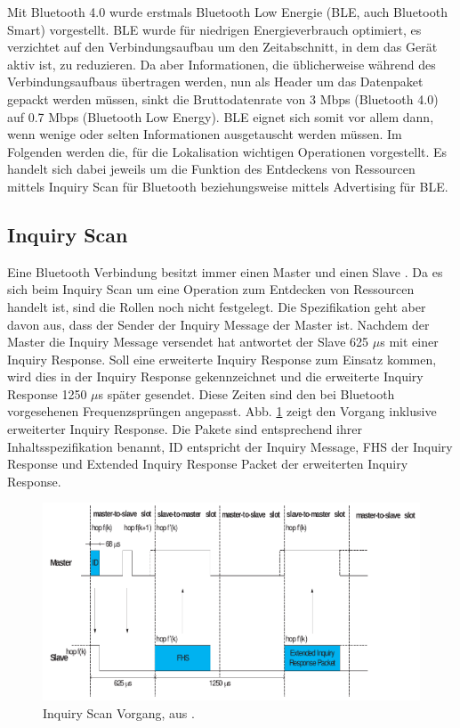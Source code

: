 Mit Bluetooth 4.0 wurde erstmals Bluetooth Low Energie (BLE, auch Bluetooth Smart) vorgestellt.
BLE wurde für niedrigen Energieverbrauch optimiert, es verzichtet auf den Verbindungsaufbau um den Zeitabschnitt, in dem das Gerät aktiv ist, zu reduzieren.
Da aber Informationen, die üblicherweise während des Verbindungsaufbaus übertragen werden, nun als Header um das Datenpaket gepackt werden müssen, sinkt die Bruttodatenrate von 3 Mbps (Bluetooth 4.0) auf 0.7 Mbps (Bluetooth Low Energy). %
BLE eignet sich somit vor allem dann, wenn wenige oder selten Informationen ausgetauscht werden müssen.
Im Folgenden werden die, für die Lokalisation wichtigen Operationen vorgestellt.
Es handelt sich dabei jeweils um die Funktion des Entdeckens von Ressourcen mittels Inquiry Scan für Bluetooth beziehungsweise mittels Advertising für BLE.

\subsection{Inquiry Scan}
Eine Bluetooth Verbindung besitzt immer einen Master und einen Slave \cite{blue2010inquiry}.
Da es sich beim Inquiry Scan um eine Operation zum Entdecken von Ressourcen handelt ist, sind die Rollen noch nicht festgelegt. 
Die Spezifikation geht aber davon aus, dass der Sender der Inquiry Message der Master ist.
Nachdem der Master die Inquiry Message versendet hat antwortet der Slave 625 $\mu$s mit einer Inquiry Response. 
Soll eine erweiterte Inquiry Response zum Einsatz kommen, wird dies in der Inquiry Response gekennzeichnet und die erweiterte Inquiry Response 1250 $\mu$s später gesendet.
Diese Zeiten sind den bei Bluetooth vorgesehenen Frequenzsprüngen angepasst.
Abb. \ref{fig:inqscan} zeigt den Vorgang inklusive erweiterter Inquiry Response.
Die Pakete sind entsprechend ihrer Inhaltsspezifikation benannt, ID entspricht der Inquiry Message, FHS der Inquiry Response und Extended Inquiry Response Packet der erweiterten Inquiry Response.

\begin{figure}[h]
  \centering
	\includegraphics[width=\textwidth]{images/inqscan.png}
  \caption{Inquiry Scan Vorgang, aus \cite{blue2010inquiry}.}
  \label{fig:inqscan}
\end{figure}

